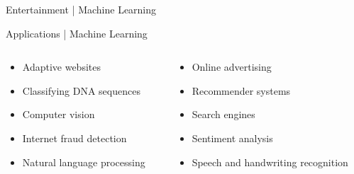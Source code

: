 \documentclass[10pt]{beamer}
\begin{document}
			\begin{frame}{Entertainment | Machine Learning}
			\end{frame}
			\begin{frame}{Applications | Machine Learning}
				\begin{columns}
					\begin{column}{0.5\textwidth}
						\begin{itemize}
							\item Adaptive websites
							\item Classifying DNA sequences
							\item Computer vision
							\item Internet fraud detection
							\item Natural language processing
						\end{itemize}
					\end{column}
					\begin{column}{0.5\textwidth}
						\begin{itemize}
							\item Online advertising
							\item Recommender systems
							\item Search engines
							\item Sentiment analysis
							\item Speech and handwriting recognition
						\end{itemize}
					\end{column}
				\end{columns}
			\end{frame}
\end{document}
